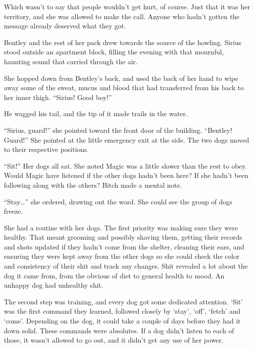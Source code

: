 Which wasn't to say that people wouldn't get hurt, of course.  Just that it was her territory, and she was allowed to make the call.  Anyone who hadn't gotten the message already deserved what they got.



Bentley and the rest of her pack drew towards the source of the howling.  Sirius stood outside an apartment block, filling the evening with that mournful, haunting sound that carried through the air.



She hopped down from Bentley's back, and used the back of her hand to wipe away some of the sweat, mucus and blood that had transferred from his back to her inner thigh.  ``Sirius!  Good boy!''



He wagged his tail, and the tip of it made trails in the water.



``Sirius, guard!'' she pointed toward the front door of the building.  ``Bentley!  Guard!'' She pointed at the little emergency exit at the side.  The two dogs moved to their respective positions.



``Sit!''  Her dogs all sat.  She noted Magic was a little slower than the rest to obey.  Would Magic have listened if the other dogs hadn't been here?  If she hadn't been following along with the others?  Bitch made a mental note.



``Stay\ldots'' she ordered, drawing out the word.  She could see the group of dogs freeze.



She had a routine with her dogs.  The first priority was making sure they were healthy.  That meant grooming and possibly shaving them, getting their records and shots updated if they hadn't come from the shelter, cleaning their ears, and ensuring they were kept away from the other dogs so she could check the color and consistency of their shit and track any changes.  Shit revealed a lot about the dog it came from, from the obvious of diet to general health to mood.  An unhappy dog had unhealthy shit.



The second step was training, and every dog got some dedicated attention.  `Sit' was the first command they learned, followed closely by `stay', `off', `fetch' and `come'.  Depending on the dog, it could take a couple of days before they had it down solid.  These commands were absolutes.  If a dog didn't listen to each of those, it wasn't allowed to go out, and it didn't get any use of her power.



